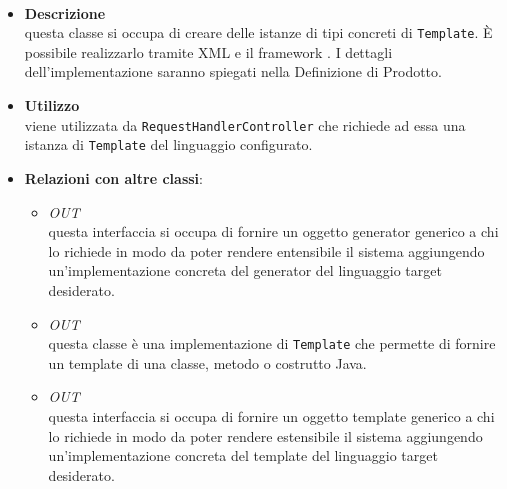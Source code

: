\paragraph{}
\label{\nogloxy{SWEDesigner::Server::Template::TemplateAssembler}}
\begin{itemize}
\item \textbf{Descrizione}\\
questa classe si occupa di creare delle istanze di tipi concreti di \texttt{Template}. È possibile realizzarlo tramite XML e il framework \spring. I dettagli dell'implementazione saranno spiegati nella Definizione di Prodotto. %
\item \textbf{Utilizzo}\\
viene utilizzata da \texttt{RequestHandlerController} che richiede ad essa una istanza di \texttt{Template} del linguaggio configurato.
\item \textbf{Relazioni con altre classi}:
\begin{itemize}
\item \textit{OUT} \hyperref[\nogloxy{SWEDesigner::Server::Generator::Generator}]{}\\
questa interfaccia si occupa di fornire un oggetto generator generico a chi lo richiede in modo da poter rendere entensibile il sistema aggiungendo un'implementazione concreta del generator del linguaggio target desiderato.
\item \textit{OUT} \hyperref[\nogloxy{SWEDesigner::Server::Template::Java::JavaTemplate}]{}\\
questa classe è una implementazione di \texttt{Template} che permette di fornire un template di una classe, metodo o costrutto Java.
\item \textit{OUT} \hyperref[\nogloxy{SWEDesigner::Server::Template::Template}]{}\\
questa interfaccia si occupa di fornire un oggetto template generico a chi lo richiede in modo da poter rendere estensibile il sistema aggiungendo un'implementazione concreta del template del linguaggio target desiderato.
\end{itemize}
\end{itemize}
\subsection{}
\label{\nogloxy{SWEDesigner::Server::Template::Java}}

